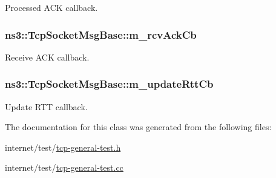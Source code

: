 Processed A\+CK callback. 

\subsubsection[{\texorpdfstring{m\+\_\+rcv\+Ack\+Cb}{m_rcvAckCb}}]{ ns3\+::\+Tcp\+Socket\+Msg\+Base\+::m\+\_\+rcv\+Ack\+Cb\hspace{0.3cm}{\ttfamily [private]}}\hypertarget{classns3_1_1TcpSocketMsgBase_a524f3cb4bf9a9e5c8a57ce132496ac21}{}\label{classns3_1_1TcpSocketMsgBase_a524f3cb4bf9a9e5c8a57ce132496ac21}


Receive A\+CK callback. 

\subsubsection[{\texorpdfstring{m\+\_\+update\+Rtt\+Cb}{m_updateRttCb}}]{ ns3\+::\+Tcp\+Socket\+Msg\+Base\+::m\+\_\+update\+Rtt\+Cb\hspace{0.3cm}{\ttfamily [private]}}\hypertarget{classns3_1_1TcpSocketMsgBase_a05049cc032290301a3dd9d654d79a006}{}\label{classns3_1_1TcpSocketMsgBase_a05049cc032290301a3dd9d654d79a006}


Update R\+TT callback. 



The documentation for this class was generated from the following files\+:\begin{DoxyCompactItemize}
\item 
internet/test/\hyperlink{tcp-general-test_8h}{tcp-\/general-\/test.\+h}\item 
internet/test/\hyperlink{tcp-general-test_8cc}{tcp-\/general-\/test.\+cc}\end{DoxyCompactItemize}
